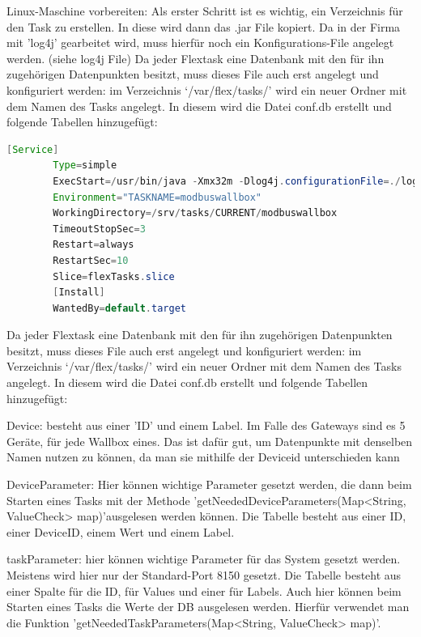 \begin{compactenum}
    \item Linux-Maschine vorbereiten: Als erster Schritt ist es wichtig, ein Verzeichnis für den Task zu erstellen. In diese wird dann das .jar File kopiert. Da in der Firma mit 'log4j' gearbeitet wird, muss hierfür noch ein Konfigurations-File angelegt werden. (siehe log4j File)
    Da jeder Flextask eine Datenbank mit den für ihn zugehörigen Datenpunkten besitzt, muss dieses File auch erst angelegt und konfiguriert werden: im Verzeichnis ‘/var/flex/tasks/’ wird ein neuer Ordner mit dem Namen des Tasks angelegt. In diesem wird die Datei conf.db erstellt und folgende Tabellen hinzugefügt:
    \begin{lstlisting}[language=java,caption=Log4J File,label=lst:impl:foo]
        [Service]
        Type=simple
        ExecStart=/usr/bin/java -Xmx32m -Dlog4j.configurationFile=./log4j2.xml -jar /srv/tasks/CURRENT/modbuswallbox/modbuswallbox.jar
        Environment="TASKNAME=modbuswallbox"
        WorkingDirectory=/srv/tasks/CURRENT/modbuswallbox
        TimeoutStopSec=3
        Restart=always
        RestartSec=10
        Slice=flexTasks.slice
        [Install]
        WantedBy=default.target
    \end{lstlisting}
    \item Da jeder Flextask eine Datenbank mit den für ihn zugehörigen Datenpunkten besitzt, muss dieses File auch erst angelegt und konfiguriert werden: im Verzeichnis ‘/var/flex/tasks/’ wird ein neuer Ordner mit dem Namen des Tasks angelegt. In diesem wird die Datei conf.db erstellt und folgende Tabellen hinzugefügt:
    \begin{compactenum}
        \item Device: besteht aus einer 'ID' und einem Label. Im Falle des Gateways sind es 5 Geräte, für jede Wallbox eines. Das ist dafür gut, um Datenpunkte mit denselben Namen nutzen zu können, da man sie mithilfe der Deviceid unterschieden kann
        \item DeviceParameter: Hier können wichtige Parameter gesetzt werden, die dann beim Starten eines Tasks mit der Methode 'getNeededDeviceParameters(Map<String, ValueCheck> map)'ausgelesen werden können. Die Tabelle besteht aus einer ID, einer DeviceID, einem Wert und einem Label.
        \item taskParameter: hier können wichtige Parameter für das System gesetzt werden. Meistens wird hier nur der Standard-Port 8150 gesetzt. Die Tabelle besteht aus einer Spalte für die ID, für Values und einer für Labels. Auch hier können beim Starten eines Tasks die Werte der DB ausgelesen werden. Hierfür verwendet man die Funktion 'getNeededTaskParameters(Map<String, ValueCheck> map)'.

\end{compactenum}
\end{compactenum}
